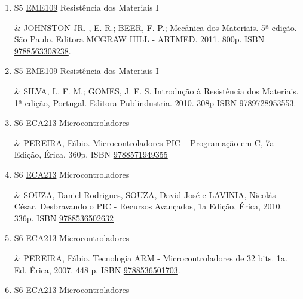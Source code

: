 \documentclass[12pt,a4paper]{book}
\begin{document}
\begin{enumerate}
&  BEER, F.  P.;  DEWOLF, J.  T.;  Resistência dos Materiais.  4ª edição.  São Paulo.  Editora  MCGRAW HILL - ARTMED.  2006.  774p.  ISBN \href{http://www.bn.br/site/pages/servicosProfissionais/agenciaISBN/isbnBusca/FbnBuscaISBNCatalogo.asp?pField=ISBN&pIntPagina=1&pISBN=86804830&nidbISBN=true&hidbISBN=true}{9788586804830}.  
 

 \item S5 \hyperref[PUD:EME109]{EME109} Resistência dos Materiais I

&  JOHNSTON JR. , E.  R.;  BEER, F.  P.;  Mecânica dos Materiais.  5ª edição.  São Paulo.  Editora MCGRAW HILL - ARTMED.  2011.  800p.  ISBN \href{http://www.bn.br/site/pages/servicosProfissionais/agenciaISBN/isbnBusca/FbnBuscaISBNCatalogo.asp?pField=ISBN&pIntPagina=1&pISBN=63308238&nidbISBN=true&hidbISBN=true}{9788563308238}. 
 

 \item S5 \hyperref[PUD:EME109]{EME109} Resistência dos Materiais I

&  SILVA, L.  F.  M.;  GOMES, J.  F.  S.  Introdução à Resistência dos Materiais. 1ª edição, Portugal.  Editora Publindustria.  2010.  308p  ISBN \href{http://www.google.com/search?hl=pt-BR&tbo=p&tbm=bks&q=isbn:9789728953553&num=10}{9789728953553}.
 \item S6 \hyperref[PUD:ECA213]{ECA213} Microcontroladores

&   PEREIRA, Fábio.  Microcontroladores PIC – Programação em C, 7a Edição, Érica.  360p.  ISBN \href{http://www.bn.br/site/pages/servicosProfissionais/agenciaISBN/isbnBusca/FbnBuscaISBNCatalogo.asp?pField=ISBN&pIntPagina=1&pISBN=71949355&nidbISBN=true&hidbISBN=true}{9788571949355}
 

 \item S6 \hyperref[PUD:ECA213]{ECA213} Microcontroladores

&   SOUZA, Daniel Rodrigues, SOUZA, David José  e LAVINIA, Nicolás César.  Desbravando o PIC - Recursos Avançados, 1a Edição, Érica, 2010.  336p.  ISBN \href{http://www.bn.br/site/pages/servicosProfissionais/agenciaISBN/isbnBusca/FbnBuscaISBNCatalogo.asp?pField=ISBN&pIntPagina=1&pISBN=36502632&nidbISBN=true&hidbISBN=true}{9788536502632}
 

 \item S6 \hyperref[PUD:ECA213]{ECA213} Microcontroladores

&   PEREIRA, Fábio.  Tecnologia ARM - Microcontroladores de 32 bits.  1a.  Ed.  Érica, 2007.  448 p.  ISBN \href{http://www.bn.br/site/pages/servicosProfissionais/agenciaISBN/isbnBusca/FbnBuscaISBNCatalogo.asp?pField=ISBN&pIntPagina=1&pISBN=36501703&nidbISBN=true&hidbISBN=true}{9788536501703}.
 \item S6 \hyperref[PUD:ECA213]{ECA213} Microcontroladores


\end{enumerate}
\end{document}
